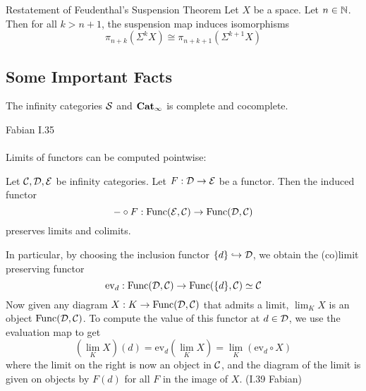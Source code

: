 \documentclass[a4paper]{article}
\begin{document}
\begin{thm}{Restatement of Feudenthal's Suspension Theorem}{} Let $X$ be a space. Let $n\in\mathbb{N}$. Then for all $k>n+1$, the suspension map induces isomorphisms $$\pi_{n+k}(\Sigma^kX)\cong\pi_{n+k+1}(\Sigma^{k+1}X)$$
\end{thm}

\subsection{Some Important Facts}
\begin{prp}{}{} The infinity categories $\mathcal{S}$ and $\bold{Cat}_\infty$ is complete and cocomplete. 
\end{prp}

Fabian I.35\\~\\

Limits of functors can be computed pointwise: 

\begin{prp}{}{} Let $\mathcal{C},\mathcal{D},\mathcal{E}$ be infinity categories. Let $F:\mathcal{D}\to\mathcal{E}$ be a functor. Then the induced functor $$-\circ F:\text{Func}(\mathcal{E},\mathcal{C})\to\text{Func}(\mathcal{D},\mathcal{C})$$ preserves limits and colimits. 
\end{prp}

In particular, by choosing the inclusion functor $\{d\}\hookrightarrow\mathcal{D}$, we obtain the (co)limit preserving functor $$\text{ev}_d:\text{Func}(\mathcal{D},\mathcal{C})\to\text{Func}(\{d\},\mathcal{C})\simeq\mathcal{C}$$ Now given any diagram $X:K\to\text{Func}(\mathcal{D},\mathcal{C})$ that admits a limit, $\lim_K X$ is an object $\text{Func}(\mathcal{D},\mathcal{C})$. To compute the value of this functor at $d\in\mathcal{D}$, we use the evaluation map to get $$\left(\lim_K X\right)(d)=\text{ev}_d\left(\lim_KX\right)=\lim_K(\text{ev}_d\circ X)$$ where the limit on the right is now an object in $\mathcal{C}$, and the diagram of the limit is given on objects by $F(d)$ for all $F$ in the image of $X$. (I.39 Fabian)
\end{document}
